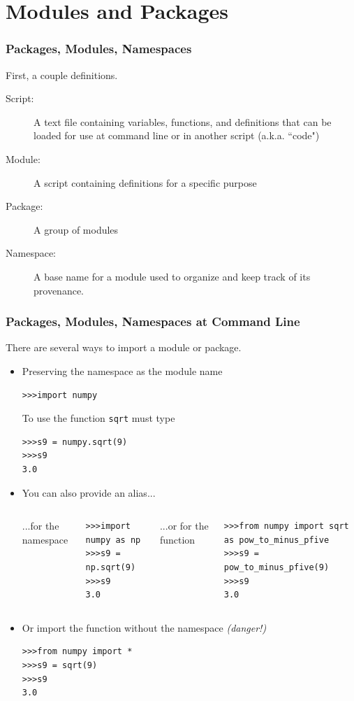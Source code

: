 \documentclass{beamer}
\begin{document}
\section[]{Modules and Packages}
\begin{frame}[fragile]
\frametitle{Packages, Modules, Namespaces}
First, a couple definitions.
\begin{description}
\item[Script:] A text file containing variables, functions, and definitions that can be 
 loaded for use at command line or in another script (a.k.a. ``code")
\item[Module:] A script containing definitions for a specific purpose
\item[Package:] A group of modules
\item[Namespace:] A base name for a module used to organize and keep track of its provenance.
\end{description}
\end{frame}

\begin{frame}[fragile]
\frametitle{Packages, Modules, Namespaces at Command Line}
There are several ways to import a module or package.
\begin{itemize}
\pause
\item Preserving the namespace as the module name
\begin{lstlisting}
>>>import numpy
\end{lstlisting}
To use the function \texttt{sqrt} must type
\begin{lstlisting}
>>>s9 = numpy.sqrt(9)
>>>s9
3.0
\end{lstlisting}
\pause
\item {You can also provide an alias...}
\begin{columns}[c]
\column{3.5cm}
...for the namespace
\begin{lstlisting}
>>>import numpy as np
>>>s9 = np.sqrt(9)
>>>s9
3.0
\end{lstlisting}
\column{4.5cm}
...or for the function
\begin{lstlisting}
>>>from numpy import sqrt as pow_to_minus_pfive
>>>s9 = pow_to_minus_pfive(9)
>>>s9
3.0
\end{lstlisting}
\end{columns}
\pause
\item Or import the function without the namespace \emph{(danger!)}
\begin{lstlisting}
>>>from numpy import *
>>>s9 = sqrt(9)
>>>s9
3.0

\end{lstlisting}
\end{itemize}
\end{frame}
\end{document}
